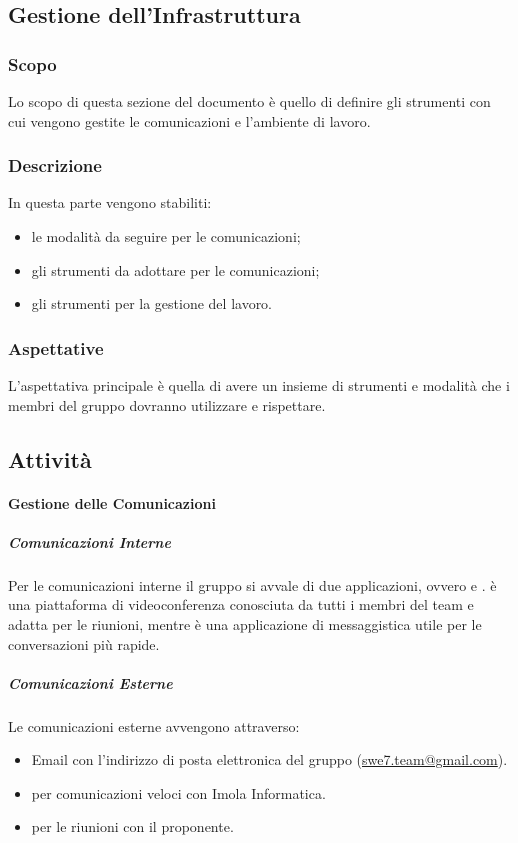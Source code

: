 \subsection{Gestione dell'Infrastruttura}
\subsubsection{Scopo}
Lo scopo di questa sezione del documento è quello di definire gli strumenti con cui vengono gestite le 
comunicazioni e l'ambiente di lavoro.

\subsubsection{Descrizione}
In questa parte vengono stabiliti:
\begin{itemize}
    \item le modalità da seguire per le comunicazioni;
    \item gli strumenti da adottare per le comunicazioni;
    \item gli strumenti per la gestione del lavoro.
\end{itemize}

\subsubsection{Aspettative}
L'aspettativa principale è quella di avere un insieme di strumenti e modalità che i membri del gruppo 
dovranno utilizzare e rispettare.

\subsection{Attività}
\paragraph{Gestione delle Comunicazioni} 
\subparagraph*{Comunicazioni Interne} \hfill \break
Per le comunicazioni interne il gruppo si avvale di due applicazioni, ovvero  e 
.  è una piattaforma di videoconferenza conosciuta da tutti i membri del 
team e adatta per le riunioni, mentre  è una applicazione di messaggistica utile per le 
conversazioni più rapide.

\subparagraph*{Comunicazioni Esterne} \hfill \break
Le comunicazioni esterne avvengono attraverso:
\begin{itemize}
    \item Email con l'indirizzo di posta elettronica del gruppo 
        (\href{mailto:swe7.team@gmail.com}{swe7.team@gmail.com}).
    \item {} per comunicazioni veloci con Imola Informatica.
    \item {} per le riunioni con il proponente.
\end{itemize}

